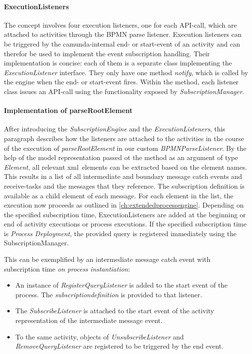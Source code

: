 \paragraph{ExecutionListeners}
The concept involves four execution listeners, one for each API-call, which are attached to activities through the BPMN parse listener.
Execution listeners can be triggered by the camunda-internal end- or start-event of an activity and can therefor be used to implement the event subscription handling.
Their implementation is concise: each of them is a separate class implementing the \textit{ExecutionListener} interface. They only have one method \textit{notify}, which is called by the engine when the end- or start-event fires.
Within the method, each listener class issues an API-call using the functionality exposed by \textit{SubscriptionManager}.



\paragraph{Implementation of parseRootElement}
After introducing the \textit{SubscriptionEngine} and the \textit{ExecutionListeners}, this paragraph describes how the listeners are attached to the activities in the course of the execution of \textit{parseRootElement} in our custom \textit{BPMNParseListener}.
By the help of the model representation passed ot the method as an argument of type \textit{Element}, all relevant xml~elements can be extracted based on the element names.
This results in a list of all intermediate and boundary message catch events and receive-tasks and the messages that they reference. The subscription definition is available as a child element of each message.
For each element in the list, the execution now proceeds as outlined in \autoref{ch:extendedprocessengine}.
Depending on the specified subscription time, ExecutionListeners are added at the beginning or end of activity executions or process executions. If the specified subscription time is \textit{Process Deployment}, the provided query is registered immediately using the SubscriptionManager.

This can be exemplified by an intermediate message catch event with subscription time \textit{on process instantiation}:
\begin{itemize}
	\item An instance of \textit{RegisterQueryListener} is added to the start event of the process. The \textit{subscriptiondefinition} is provided to that listener.
	\item The \textit{SubscribeListener} is attached to the start event of the activity representation of the intermediate message event.
	\item To the same activity, objects of \textit{UnsubscribeListener} and \textit{RemoveQueryListener} are registered to be triggered by the end event.
\end{itemize}

